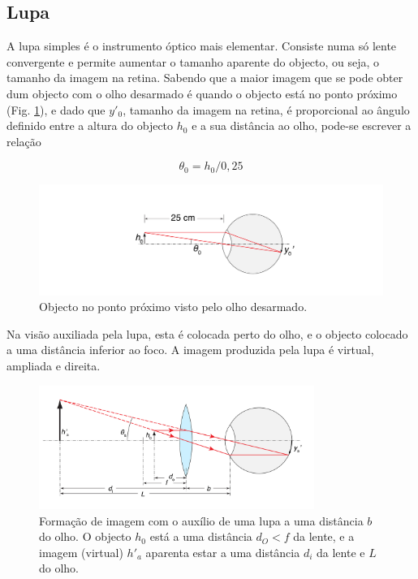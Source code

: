 \documentclass[a4paper,12pt]{article}      %
\begin{document}
\subsection{\sf Lupa}

A lupa simples é o instrumento óptico mais elementar. Consiste numa só lente convergente e permite aumentar o tamanho aparente do objecto, ou seja, o tamanho da imagem na retina. Sabendo que a maior imagem que se pode obter dum objecto com o olho desarmado é quando o objecto está no ponto próximo (Fig. \ref{fig:olho-4}), e dado que $y'_0$, tamanho da imagem na retina, é proporcional ao ângulo definido entre a altura do objecto $h_0$ e a sua distância ao olho, pode-se escrever a relação

\begin{equation}
\theta_0=h_0/0,25
\end{equation}

\begin{figure}
	[!htb]  \centering 
	\includegraphics[width=1.0\textwidth]{olho-4}
		\caption{Objecto no ponto próximo visto pelo olho desarmado. \label{fig:olho-4}} 
\end{figure}

Na visão auxiliada pela lupa, esta é colocada perto do olho, e o objecto colocado a uma distância inferior ao foco. A imagem produzida pela lupa é virtual, ampliada e direita.

\begin{figure}
	[!htb]  \centering 
	\includegraphics[width=0.8\textwidth]{olho-5}
	\caption{Formação de imagem com o auxílio de uma lupa a uma distância $b$ do olho. O objecto $h_0$ está a uma distância $d_O<f$ da lente, e a imagem (virtual) $h'_a$ aparenta estar a uma distância $d_i$ da lente e $L$ do olho. \label{fig:olho-5}} 
\end{figure}
\end{document}
